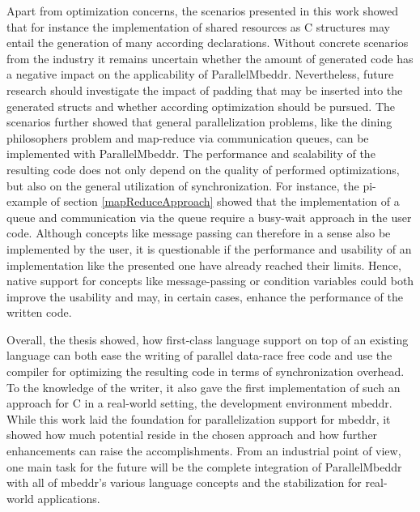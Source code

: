 Apart from optimization concerns, the scenarios presented in this work showed that for instance the implementation of shared resources as C structures may entail the generation of many according declarations. Without concrete scenarios from the industry it remains uncertain whether the amount of generated code has a negative impact on the applicability of ParallelMbeddr. Nevertheless, future research should investigate the impact of padding that may be inserted into the generated structs and whether according optimization should be pursued. The scenarios further showed that general parallelization problems, like the dining philosophers problem and map-reduce via communication queues, can be implemented with ParallelMbeddr. The performance and scalability of the resulting code does not only depend on the quality of performed optimizations, but also on the general utilization of synchronization. For instance, the pi-example of section \ref{mapReduceApproach} showed that the implementation of a queue and communication via the queue require a busy-wait approach in the user code. Although concepts like message passing can therefore in a sense also be implemented by the user, it is questionable if the performance and usability of an implementation like the presented one have already reached their limits. Hence, native support for concepts like message-passing or condition variables could both improve the usability and may, in certain cases, enhance the performance of the written code.

Overall, the thesis showed, how first-class language support on top of an existing language can both ease the writing of parallel data-race free code and use the compiler for optimizing the resulting code in terms of synchronization overhead. To the knowledge of the writer, it also gave the first implementation of such an approach for C in a real-world setting, the development environment mbeddr. While this work laid the foundation for parallelization support for mbeddr, it showed how much potential reside in the chosen approach and how further enhancements can raise the accomplishments. From an industrial point of view, one main task for the future will be the complete integration of ParallelMbeddr with all of mbeddr's various language concepts and the stabilization for real-world applications.
